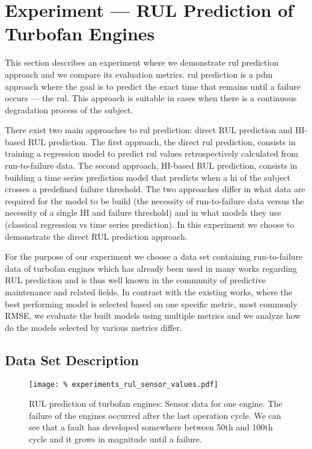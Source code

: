 \section{Experiment --- RUL Prediction of Turbofan Engines}
\label{sec:experiments_rul}

This section describes an experiment where we demonstrate \gls{rul} prediction approach and we compare its evaluation metrics.
\Gls{rul} prediction is a \gls{pdm} approach where the goal is to predict the exact time that remains until a failure occurs --- the \acrfull{rul}.
This approach is suitable in cases when there is a continuous degradation process of the subject.

There exist two main approaches to \gls{rul} prediction: direct RUL prediction and HI-based RUL prediction.
The first approach, the direct \gls{rul} prediction, consists in training a regression model to predict \gls{rul} values retrospectively calculated from run-to-failure data.
The second approach, HI-based RUL prediction, consists in building a time series prediction model that predicts when a \acrfull{hi} of the subject crosses a predefined failure threshold.
The two approaches differ in what data are required for the model to be build (the necessity of run-to-failure data versus the necessity of a single HI and failure threshold) and in what models they use (classical regression vs time series prediction).
In this experiment we choose to demonstrate the direct RUL prediction approach. 

For the purpose of our experiment we choose a data set containing run-to-failure data of turbofan engines \cite{data_set_turbofan} which has already been used in many works regarding RUL prediction \cite{mosallam2016data, ellefsen2019remaining, babu2016deep, peng2019bayesian} and is thus well known in the community of predictive maintenance and related fields.
In contrast with the existing works, where the best performing model is selected based on one specific metric, most commonly RMSE, we evaluate the built models using multiple metrics and we analyze how do the models selected by various metrics differ.

\subsection{Data Set Description}
\label{sec:experiment_rul_data}

\begin{figure}
    \texttt{[image: \%
        experiments\_rul\_sensor\_values.pdf]}
	\centering
	\caption{RUL prediction of turbofan engines: Sensor data for one engine. The failure of the engines occurred after the last operation cycle. We can see that a fault has developed somewhere between 50th and 100th cycle and it grows in magnitude until a failure.}
	\label{fig:turbofan_sensors}
\end{figure}

